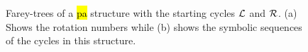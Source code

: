 \begin{figure}
{	}
	\qquad
	\caption[Farey-trees of a  structure between $\L$ and $\R$]{
		Farey-trees of a \hl{\gls{pa}} structure with the starting cycles $\L$ and $\R$.
		(a) Shows the rotation numbers while (b) shows the symbolic sequences of the cycles in this structure.
	}
	\label{fig:state.discont.adding.farey}
\end{figure}
